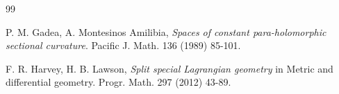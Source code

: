 \documentclass[11pt, reqno]{amsart}
\newcommand{\KE }{K\"{a}hler-Einstein }
\begin{document}
{\begin{thebibliography}{99}

%
  P. M. Gadea, A. Montesinos Amilibia,
\emph{Spaces of constant para-holomorphic sectional curvature}. Pacific J. Math. 136 (1989) 85-101.
 
  F. R. Harvey, H. B. Lawson, 
\emph{Split special Lagrangian geometry} in Metric and differential geometry.
Progr. Math. 297 (2012)  43-89.














\end{thebibliography}}
\end{document}
